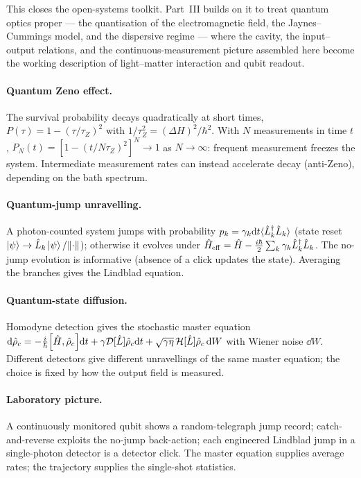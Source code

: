 This closes the open-systems toolkit. Part~III builds on it to treat
quantum optics proper --- the quantisation of the electromagnetic
field, the Jaynes--Cummings model, and the dispersive regime ---
where the cavity, the input--output relations, and the
continuous-measurement picture assembled here become the working
description of light--matter interaction and qubit readout.

\clearpage
\begin{chaptersummary}

\paragraph{Quantum Zeno effect.}
The survival probability decays quadratically at short times,
$P(\tau)=1-(\tau/\tau_Z)^2$ with $1/\tau_Z^2=(\Delta H)^2/\hbar^2$.
With $N$ measurements in time $t$,
$P_N(t)=[1-(t/N\tau_Z)^2]^N\to1$ as $N\to\infty$: frequent
measurement freezes the system. Intermediate measurement rates can
instead accelerate decay (anti-Zeno), depending on the bath
spectrum.

\paragraph{Quantum-jump unravelling.}
A photon-counted system jumps with probability
$p_k=\gamma_k\dd t\langle\hat{L}_k^\dagger\hat{L}_k\rangle$ (state reset
$\ket\psi\to\hat{L}_k\ket\psi/\lVert\cdot\rVert$); otherwise it evolves
under $\hat{H}_{\rm eff}=\hat{H}-\tfrac{i\hbar}{2}\sum_k\gamma_k\hat{L}_k^\dagger\hat{L}_k$.
The no-jump evolution is informative (absence of a click updates the
state). Averaging the branches gives the Lindblad equation.

\paragraph{Quantum-state diffusion.}
Homodyne detection gives the stochastic master equation
$\dd\op\rho_c=-\tfrac{i}{\hbar}\comm{\op H}{\op\rho_c}\dd t+\gamma\mathcal D[\op L]\op\rho_c\dd t+\sqrt{\gamma\eta}\,\mathcal H[\op L]\op\rho_c\,\dd W$
with Wiener noise $\dd W$. Different detectors give different
unravellings of the same master equation; the choice is fixed by
how the output field is measured.

\paragraph{Laboratory picture.}
A continuously monitored qubit shows a random-telegraph jump record;
catch-and-reverse exploits the no-jump back-action; each engineered
Lindblad jump in a single-photon detector is a detector click. The
master equation supplies average rates; the trajectory supplies the
single-shot statistics.

\end{chaptersummary}

